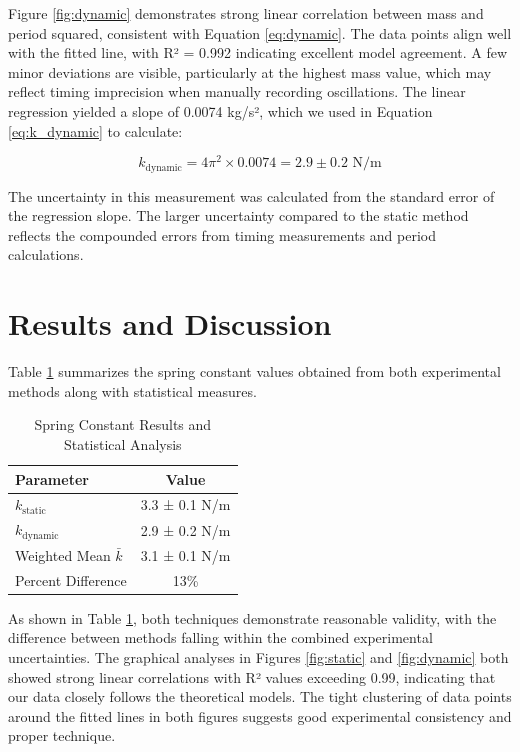 \documentclass[12pt]{article}
\begin{document}
Figure \ref{fig:dynamic} demonstrates strong linear correlation between mass and period squared, consistent with Equation \ref{eq:dynamic}. The data points align well with the fitted line, with R² = 0.992 indicating excellent model agreement. A few minor deviations are visible, particularly at the highest mass value, which may reflect timing imprecision when manually recording oscillations. The linear regression yielded a slope of 0.0074 kg/s², which we used in Equation \ref{eq:k_dynamic} to calculate:

\begin{equation}
k_{\text{dynamic}} = 4\pi^2 \times 0.0074 = 2.9 \pm 0.2 \text{ N/m}
\label{eq:result_dynamic}
\end{equation}

The uncertainty in this measurement was calculated from the standard error of the regression slope. The larger uncertainty compared to the static method reflects the compounded errors from timing measurements and period calculations.

\section*{Results and Discussion}

Table \ref{tab:results} summarizes the spring constant values obtained from both experimental methods along with statistical measures.

\begin{table}[H]
\centering
\caption{Spring Constant Results and Statistical Analysis}
\begin{tabular}{lc}
\toprule
Parameter & Value \\
\midrule
$k_{\text{static}}$ & 3.3 ± 0.1 N/m \\
$k_{\text{dynamic}}$ & 2.9 ± 0.2 N/m \\
Weighted Mean $\bar{k}$ & 3.1 ± 0.1 N/m \\
Percent Difference & 13\% \\
\bottomrule
\end{tabular}
\label{tab:results}
\end{table}

As shown in Table \ref{tab:results}, both techniques demonstrate reasonable validity, with the difference between methods falling within the combined experimental uncertainties. The graphical analyses in Figures \ref{fig:static} and \ref{fig:dynamic} both showed strong linear correlations with R² values exceeding 0.99, indicating that our data closely follows the theoretical models. The tight clustering of data points around the fitted lines in both figures suggests good experimental consistency and proper technique.
\end{document}
